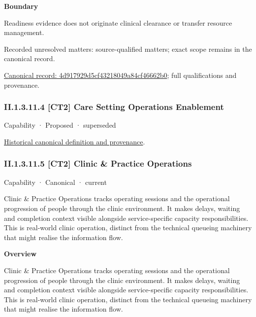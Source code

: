 \textbf{Boundary}



Readiness evidence does not originate clinical clearance or transfer resource management.


{\small Recorded unresolved matters: source-qualified matters; exact scope remains in the canonical record.}\par
{\footnotesize \href{../../../../continuum/strategy/capability/feature/4d917929d5cf43218049a84cf46662b0.md}{Canonical record: 4d917929d5cf43218049a84cf46662b0}; full qualifications and provenance.}\par
\subsubsection*{II.1.3.11.4 [CT2] Care Setting Operations Enablement}
\label{navigation:II.1.3.11.4}

\label{element:a03741e6e98642bea44680d23fdcb434}
{\small Capability · Proposed · superseded}\par
\href{../../../../continuum/strategy/capability/a03741e6e98642bea44680d23fdcb434.md}{Historical canonical definition and provenance}.\par
\subsubsection*{II.1.3.11.5 [CT2] Clinic \& Practice Operations}
\label{navigation:II.1.3.11.5}

\label{element:3dffe63e03124efab255204ee4e9a5d9}
{\small Capability · Canonical · current}\par

Clinic \& Practice Operations tracks operating sessions and the operational progression of people through the clinic environment. It makes delays, waiting and completion context visible alongside service-specific capacity responsibilities. This is real-world clinic operation, distinct from the technical queueing machinery that might realise the information flow.



\textbf{Overview}



Clinic \& Practice Operations tracks operating sessions and the operational progression of people through the clinic environment. It makes delays, waiting and completion context visible alongside service-specific capacity responsibilities. This is real-world clinic operation, distinct from the technical queueing machinery that might realise the information flow.



